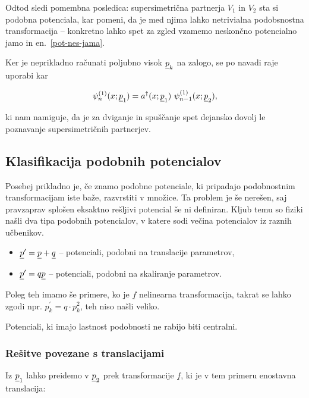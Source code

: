 \ni Odtod sledi pomembna posledica: supersimetri\v cna partnerja $V_1$ in $V_2$ sta si podobna potenciala, kar
pomeni, da je med njima lahko netrivialna podobsnostna transformacija -- konkretno lahko spet za zgled vzamemo
neskon\v cno potencialno jamo in en.~\eqref{pot-nes-jama}.

Ker je neprikladno ra\v cunati poljubno visok $\underline{p}_k$ na zalogo, se po navadi raje uporabi kar

\begin{equation}
	\psi^{(1)}_n (x; \underline{p}_1) = a^\dagger (x; \underline{p}_1)\ \psi_{n-1}^{(1)} (x; \underline{p}_2),
\end{equation}

\ni ki nam namiguje, da je za dviganje in spu\v s\v canje spet dejansko dovolj le poznavanje supersimetri\v cnih
partnerjev.

\subsection{Klasifikacija podobnih potencialov}

Posebej prikladno je, \v ce znamo podobne potenciale, ki pripadajo podobnostnim transformacijam iste ba\v ze,
razvrstiti v mno\v zice. Ta problem je \v se nere\v sen, saj pravzaprav splo\v sen eksaktno re\v sljivi potencial
\v se ni definiran. Kljub temu so fiziki na\v sli dva tipa podobnih potencialov, v katere sodi ve\v cina
potencialov iz raznih u\v cbenikov.

\begin{itemize}
	\item{$\underline{p}^\prime = \underline{p} + \underline{q}$ -- potenciali, podobni na translacije parametrov,}
	\item{$\underline{p}^\prime = q\underline{p}$ -- potenciali, podobni na skaliranje parametrov.}
\end{itemize}

Poleg teh imamo \v se primere, ko je $\underline{f}$ nelinearna transformacija, takrat se lahko
zgodi npr. $p^\prime_k = q \cdot p_k^2$, teh niso na\v sli veliko.

Potenciali, ki imajo lastnost podobnosti ne rabijo biti centralni.

\subsubsection{Re\v sitve povezane s translacijami}

Iz $\underline{p}_1$ lahko preidemo v $\underline{p}_2$ prek transformacije $\underline{f}$, ki je v tem primeru enostavna
translacija:


